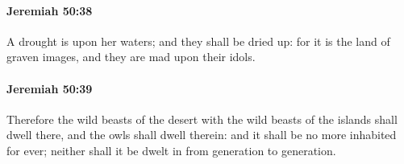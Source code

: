 		\paragraph{Jeremiah 50:38} %
			\label{JEREMIAH-50-38}

			A drought is upon her waters; and they shall be dried up: for it is the land of graven images, and they are mad upon their idols.


		\paragraph{Jeremiah 50:39} %
			\label{JEREMIAH-50-39}

			Therefore the wild beasts of the desert with the wild beasts of the islands shall dwell there, and the owls shall dwell therein: and it shall be no more inhabited for ever; neither shall it be dwelt in from generation to generation.

